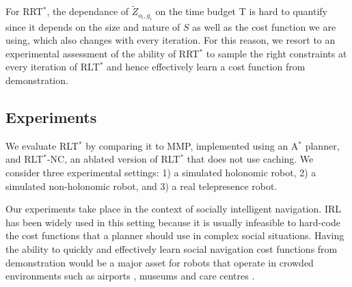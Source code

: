 \documentclass[a4paper,11pt]{report}
\begin{document}



For RRT$^*$, the dependance of $\tilde{Z}_{o_i,g_i}$ on the time budget T is hard to quantify since it depends on the size and nature of $S$ as well as the cost function we are using, which also changes with every iteration. For this reason, we resort to an experimental assessment of the ability of RRT$^*$ to sample the right constraints at every iteration of RLT$^*$ and hence effectively learn a cost function from demonstration.

\subsection{Experiments}

We evaluate RLT$^*$ by comparing it to MMP, implemented using an A$^*$ planner, and RLT$^*$-NC, an ablated version of RLT$^*$ that does not use caching.  We consider three experimental settings: 1) a simulated holonomic robot, 2) a simulated non-holonomic robot, and 3) a real telepresence robot.
	
	Our experiments take place in the context of socially intelligent navigation. IRL has been widely used in this setting \cite{henry2010learning,vasquez2014inverse,okallearning} because it is usually infeasible to hard-code the cost functions that a planner should use in complex social situations. Having the ability to quickly and effectively learn social navigation cost functions from demonstration would be a major asset for robots that operate in crowded environments such as airports \cite{triebel2015spencer}, museums \cite{thrun1999minerva} and care centres \cite{shiarlis2015teresa}.
	
\end{document}
